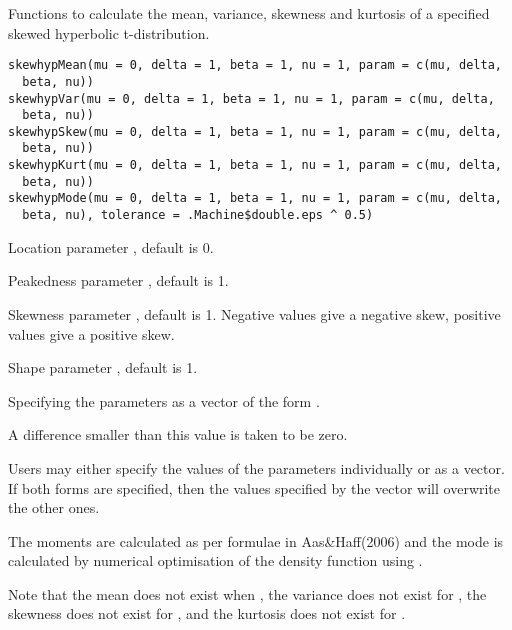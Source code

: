 \begin{Description}\relax
Functions to calculate the mean, variance, skewness and kurtosis of a
specified skewed hyperbolic t-distribution.
\end{Description}
\begin{Usage}
\begin{verbatim}
skewhypMean(mu = 0, delta = 1, beta = 1, nu = 1, param = c(mu, delta,
  beta, nu))
skewhypVar(mu = 0, delta = 1, beta = 1, nu = 1, param = c(mu, delta,
  beta, nu))
skewhypSkew(mu = 0, delta = 1, beta = 1, nu = 1, param = c(mu, delta,
  beta, nu))
skewhypKurt(mu = 0, delta = 1, beta = 1, nu = 1, param = c(mu, delta,
  beta, nu))
skewhypMode(mu = 0, delta = 1, beta = 1, nu = 1, param = c(mu, delta,
  beta, nu), tolerance = .Machine$double.eps ^ 0.5)
\end{verbatim}
\end{Usage}
\begin{Arguments}
\begin{ldescription}
\item[\code{mu}] Location parameter , default is 0.
\item[\code{delta}] Peakedness parameter , default is 1.
\item[\code{beta}] Skewness parameter , default is 1. Negative
values give a negative skew, positive values give a positive skew.
\item[\code{nu}] Shape parameter \eqn{\nu}{\nu}, default is 1.
\item[\code{param}] Specifying the parameters as a vector of the form
.
\item[\code{tolerance}] A difference smaller than this value is taken to be zero.
\end{ldescription}
\end{Arguments}
\begin{Details}\relax
Users may either specify the values of the parameters individually or
as a vector. If both forms are specified, then the values specified by
the vector  will overwrite the other ones.

The moments are calculated as per formulae in Aas\&Haff(2006) and the
mode is calculated by numerical optimisation of the density function
using .

Note that the mean does not exist when , the
variance does not exist for , the skewness does
not exist for , and the kurtosis does not exist
for .
\end{Details}
